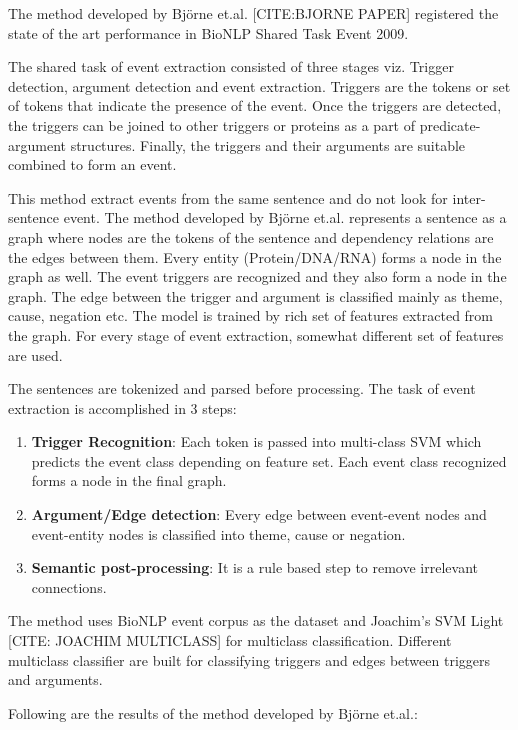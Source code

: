 The method developed by Björne et.al. [CITE:BJORNE PAPER] registered the state of the art performance in BioNLP Shared Task Event 2009. 

The shared task of event extraction consisted of three stages viz. Trigger detection, argument detection and event extraction. Triggers are the tokens or set of tokens that indicate the presence of the event. Once the triggers are detected, the triggers can be joined to other triggers or proteins as a part of predicate-argument structures. Finally, the triggers and their arguments are suitable combined to form an event.

This method extract events from the same sentence and do not look for inter-sentence event. The method developed by Björne et.al. represents a sentence as a graph where nodes are the tokens of the sentence and dependency relations are the edges between them. Every entity (Protein/DNA/RNA) forms a node in the graph as well. The event triggers are recognized and they also form a node in the graph. The edge between the trigger and argument is classified mainly as theme, cause,  negation etc. The model is trained by rich set of features extracted from the graph. For every stage of event extraction, somewhat different set of features are used. 

The sentences are tokenized and parsed before processing. The task of event extraction is accomplished in 3 steps:

\begin{enumerate}
\item \textbf{Trigger Recognition}: Each token is passed into multi-class SVM which predicts the event class depending on feature set. Each event class recognized forms a node in the final graph.

\item \textbf{Argument/Edge detection}: Every edge between event-event nodes and event-entity nodes is classified into theme, cause or negation.

\item \textbf{Semantic post-processing}: It is a rule based step to remove irrelevant connections. 
\end{enumerate}

The method uses BioNLP event corpus as the dataset and Joachim's SVM Light [CITE: JOACHIM MULTICLASS] for multiclass classification. Different multiclass classifier are built for classifying triggers and edges between triggers and arguments.

Following are the results of the method developed by Björne et.al.:

